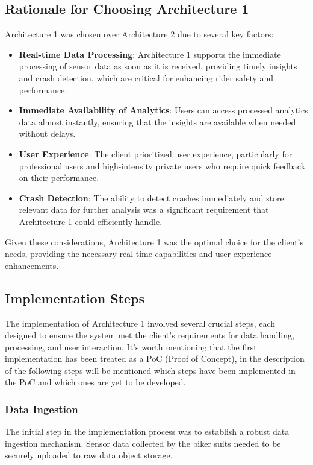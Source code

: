 \subsection{Rationale for Choosing Architecture 1}
Architecture 1 was chosen over Architecture 2 due to several key factors:
\begin{itemize}
    \item \textbf{Real-time Data Processing}: Architecture 1 supports the immediate processing of sensor data as soon as it is received, providing timely insights and crash detection, which are critical for enhancing rider safety and performance.
    \item \textbf{Immediate Availability of Analytics}: Users can access processed analytics data almost instantly, ensuring that the insights are available when needed without delays.
    \item \textbf{User Experience}: The client prioritized user experience, particularly for professional users and high-intensity private users who require quick feedback on their performance.
    \item \textbf{Crash Detection}: The ability to detect crashes immediately and store relevant data for further analysis was a significant requirement that Architecture 1 could efficiently handle.
\end{itemize}

Given these considerations, Architecture 1 was the optimal choice for the client's needs, providing the necessary real-time capabilities and user experience enhancements.

\subsection{Implementation Steps}
The implementation of Architecture 1 involved several crucial steps, each designed to ensure the system met the client's requirements for data handling, processing, and user interaction. It's worth mentioning that the first implementation has been treated as a PoC (Proof of Concept), in the description of the following steps will be mentioned which steps have been implemented in the PoC and which ones are yet to be developed.

\subsubsection{Data Ingestion}
The initial step in the implementation process was to establish a robust data ingestion mechanism. Sensor data collected by the biker suits needed to be securely uploaded to raw data object storage.

